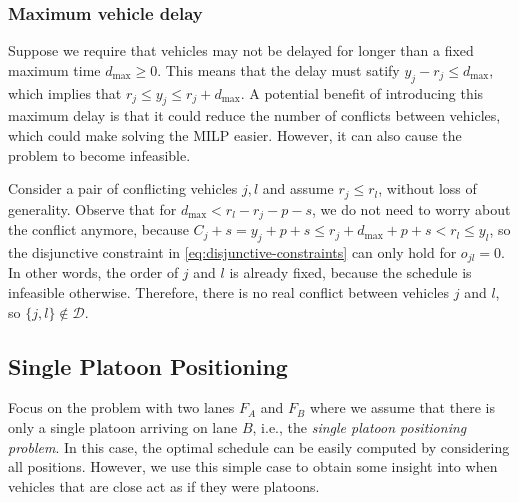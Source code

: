 \documentclass{article}
\theoremstyle{definition}
\theoremstyle{plain}
\begin{document}
\subsubsection{Maximum vehicle delay}

Suppose we require that vehicles may not be delayed for longer than a fixed
maximum time $d_{\text{max}} \geq 0$. This means that the delay must satify
$y_{j} - r_{j} \leq d_{\text{max}}$, which implies that
$r_{j} \leq y_{j} \leq r_{j} + d_{\text{max}}$. A potential benefit of
introducing this maximum delay is that it could reduce the number of conflicts
between vehicles, which could make solving the MILP easier. However, it can also
cause the problem to become infeasible.

Consider a pair of conflicting vehicles $j, l$ and assume $r_{j} \leq r_{l}$,
without loss of generality. Observe that for
$d_{\text{max}} < r_{l} - r_{j} - p - s$, we do not need to worry about the
conflict anymore, because
$C_{j} + s = y_{j} + p + s \leq r_{j} + d_{\text{max}} + p + s < r_{l} \leq y_{l}$,
so the disjunctive constraint in \eqref{eq:disjunctive-constraints} can only
hold for $o_{jl} = 0$. In other words, the order of $j$ and $l$ is already
fixed, because the schedule is infeasible otherwise. Therefore, there is no real
conflict between vehicles $j$ and $l$, so $\{j, l\} \notin \mathcal{D}$.


\subsection{Single Platoon Positioning}

Focus on the problem with two lanes $F_{A}$ and $F_{B}$ where we assume that
there is only a single platoon arriving on lane $B$, i.e., the \textit{single
  platoon positioning problem}. In this case, the optimal schedule can be easily
computed by considering all positions. However, we use this simple case to
obtain some insight into when vehicles that are close act as if they were
platoons.
\end{document}
